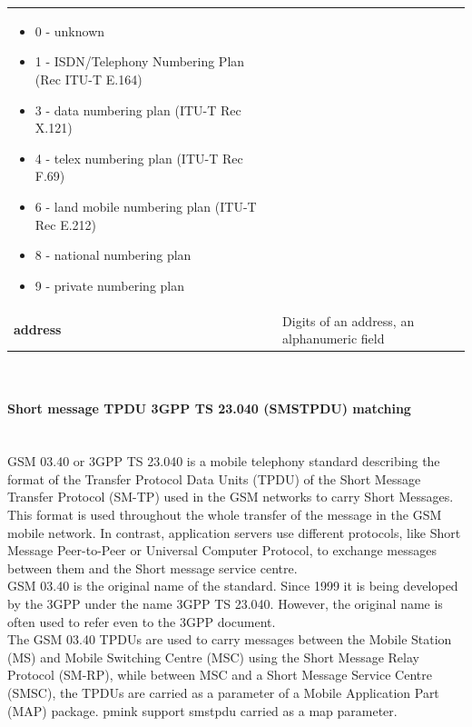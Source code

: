\documentclass[a4paper,latin]{paper}
\begin{document}
\begin{tabularx}{\textwidth}{ | l | X |}
\begin{itemize}
							\item 0 - unknown
							\item 1 - ISDN/Telephony Numbering Plan (Rec ITU-T E.164)
							\item 3 - data numbering plan (ITU-T Rec X.121)
							\item 4 - telex numbering plan (ITU-T Rec F.69)
							\item 6 - land mobile numbering plan (ITU-T Rec E.212)
							\item 8 - national numbering plan
							\item 9 - private numbering plan 
						    \end{itemize} \\ 
	\textbf{address}			& Digits of an address, an alphanumeric field \\ 

	\hline
\end{tabularx}\\
\clearpage


\paragraph{Short message TPDU 3GPP TS 23.040 (SMSTPDU) matching}
\mbox{}\\
GSM 03.40 or 3GPP TS 23.040 is a mobile telephony standard describing the format of the Transfer Protocol Data Units (TPDU) of the Short Message Transfer Protocol 
(SM-TP) used in the GSM networks to carry Short Messages. This format is used throughout the whole transfer of the message in the GSM mobile network. In contrast, 
application servers use different protocols, like Short Message Peer-to-Peer or Universal Computer Protocol, to exchange messages between them and the Short message service centre.\\

GSM 03.40 is the original name of the standard. Since 1999 it is being developed by the 3GPP under the name 3GPP TS 23.040. However, the original name is often used to refer even to 
the 3GPP document.\\

The GSM 03.40 TPDUs are used to carry messages between the Mobile Station (MS) and Mobile Switching Centre (MSC) using the Short Message Relay Protocol (SM-RP), while between MSC and
a Short Message Service Centre (SMSC), the TPDUs are carried as a parameter of a Mobile Application Part (MAP) package. \acrfull{pmink} support \acrshort{smstpdu} carried 
as a \acrshort{map} parameter.\\
\end{document}
